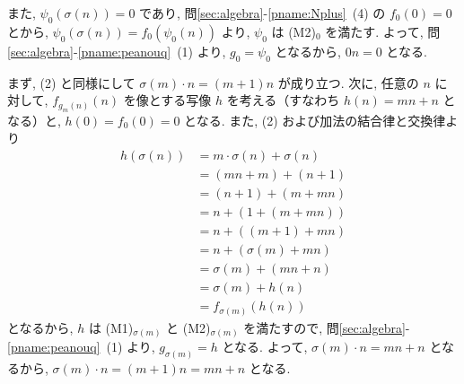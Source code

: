 \begin{nmprob}
{また, $\psi_0(\sigma(n)) = 0$ であり, 問\ref{sec:algebra}-\ref{pname:Nplus}\ (4) の $f_0(0) = 0$ とから, $\psi_0(\sigma(n)) = f_0(\psi_0(n))$ より, $\psi_0$ は (M2)$_0$ を満たす.
よって, 問\ref{sec:algebra}-\ref{pname:peanouq}\ (1) より, $g_0 = \psi_0$ となるから, $0n = 0$ となる.
\item まず, (2) と同様にして $\sigma (m) \cdot n = (m + 1)n$ が成り立つ.
次に, 任意の $n$ に対して, $f_{g_m(n)}(n)$ を像とする写像 $h$ を考える（すなわち $h(n) = mn + n$ となる）と, $h(0) = f_0(0) = 0$ となる.
また, (2) および加法の結合律と交換律より
\begin{align*}
    h(\sigma (n)) &= m \cdot \sigma (n) + \sigma (n)\\ 
    &= (mn + m) + (n + 1)\\
    &= (n + 1) + (m + mn)\\
    &= n + (1 + (m + mn))\\
    &= n + ((m + 1) + mn)\\
    &= n + (\sigma (m) + mn)\\
    &= \sigma(m) + (mn + n)\\
    &= \sigma(m) + h(n)\\
    &= f_{\sigma (m)}(h(n))
\end{align*}
となるから, $h$ は (M1)$_{\sigma (m)}$ と (M2)$_{\sigma (m)}$ を満たすので, 問\ref{sec:algebra}-\ref{pname:peanouq}\ (1) より, $g_{\sigma (m)} = h$ となる.
よって, $\sigma (m) \cdot n = mn + n$ となるから, $\sigma (m) \cdot n = (m + 1)n = mn + n$ となる.


}
\newpage
{}
\begin{figure}[htbp]
    \centering
\end{figure}
\end{nmprob}
